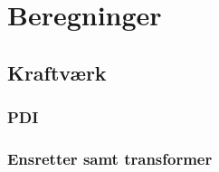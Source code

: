 \section{Beregninger} \label{Chap:Beregninger}
\subsection{Kraftværk}
\subsubsection{PDI}

\subsubsection{Ensretter samt transformer}

